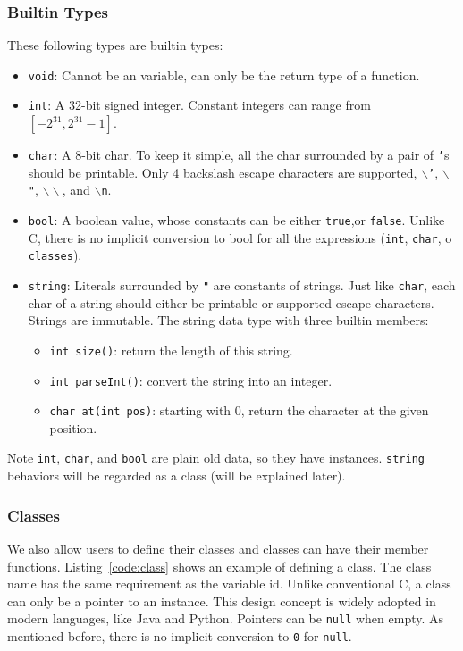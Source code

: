 \documentclass{article}
\begin{document}
\subsubsection{Builtin Types}
These following types are builtin types:
\begin{itemize}
  \item \texttt{void}: Cannot be an variable, can only be the return type of a function.
  \item \texttt{int}: A 32-bit signed integer. Constant integers can range from $[-2^{31},2^{31}-1]$.
  \item \texttt{char}: A 8-bit char. To keep it simple, all the char surrounded by a pair of
    \texttt{'}s should be printable.
    Only 4 backslash escape characters are supported, $\backslash$\texttt{'}, $\backslash$\texttt{"},
    $\backslash\backslash$, and $\backslash$\texttt{n}.
  \item \texttt{bool}: A boolean value, whose constants can be either \texttt{true},or \texttt{false}.
    Unlike C, there is no implicit conversion to bool for all the expressions (\texttt{int}, \texttt{char}, o \texttt{classes}).
  \item \texttt{string}: Literals surrounded by \texttt{"} are constants of strings. Just like
    \texttt{char}, each char of a string should either be printable or supported escape characters.
    Strings are immutable.
    The string data type with three builtin members:
    \begin{itemize}
      \item \texttt{int size()}: return the length of this string.
      \item \texttt{int parseInt()}: convert the string into an integer.
      \item \texttt{char at(int pos)}: starting with 0, return the character at the given position.
    \end{itemize}
\end{itemize}

Note \texttt{int}, \texttt{char}, and \texttt{bool} are plain old data, so they have instances.
\texttt{string} behaviors will be regarded as a class (will be explained later).


\subsubsection{Classes}

We also allow users to define their classes and classes can have their member functions.
Listing~\ref{code:class} shows an example of defining a class.
The class name has the same requirement as the variable id.
Unlike conventional C, a class can only be a pointer to an instance.
This design concept is widely adopted in modern languages, like Java and Python.
Pointers can be \texttt{null} when empty. As mentioned before, there is no implicit conversion
to \texttt{0} for \texttt{null}.
\end{document}
